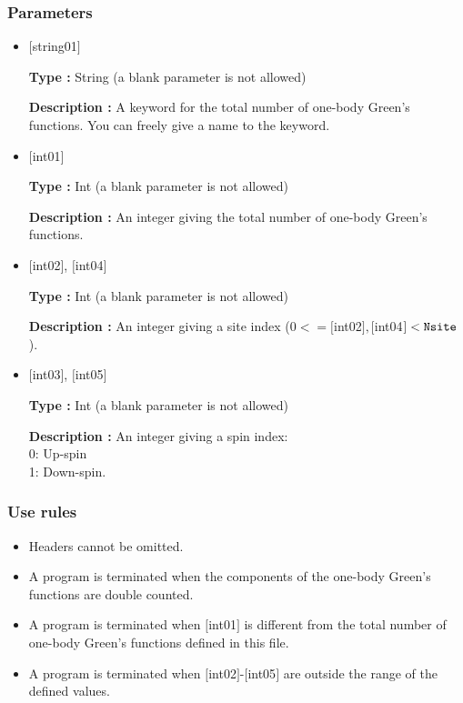 \subsubsection{Parameters}
 \begin{itemize}

    \item  $[$string01$]$
   
    {\bf Type :} String (a blank parameter is not allowed)

   {\bf Description :} A keyword for the total number of one-body Green's functions. You can freely give a name to the keyword.

   \item  $[$int01$]$
   
    {\bf Type :} Int (a blank parameter is not allowed)

   {\bf Description :}  An integer giving the total number of one-body Green's functions.

  \item  $[$int02$]$, $[$int04$]$

 {\bf Type :} Int (a blank parameter is not allowed)

{\bf Description :} An integer giving a site index ($0<= [$int02$], [$int04$]<\verb|Nsite|$).
 
  \item  $[$int03$]$, $[$int05$]$

 {\bf Type :} Int (a blank parameter is not allowed)

{\bf Description :} 
An integer giving a spin index:\\
0: Up-spin\\
1: Down-spin.

\end{itemize}

\subsubsection{Use rules}
\begin{itemize}
\item Headers cannot be omitted. 
\item A program is terminated when the components of the one-body Green's functions are double counted.
\item A program is terminated when $[$int01$]$ is different from the total number of one-body Green's functions defined in this file.
\item A program is terminated when $[$int02$]$-$[$int05$]$ are outside the range of the defined values.
\end{itemize}

